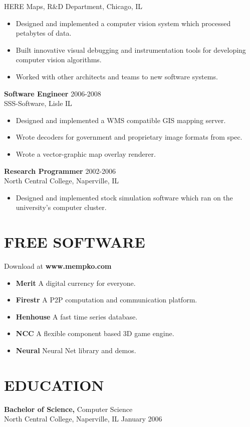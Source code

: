 \documentclass[line,margin]{res}
\begin{document}
\begin{resume}
                HERE Maps, 
                R\&D Department, Chicago, IL
                 \begin{itemize}  \itemsep -1pt %
                    \item Designed and implemented a computer vision 
                        system which processed petabytes of data.
                    \item Built innovative visual debugging and instrumentation tools for developing computer vision algorithms.
                    \item Worked with other architects and teams to new software systems.
                \end{itemize}
                {\bf Software Engineer} \hfill  2006-2008 \\
                SSS-Software, Lisle IL
                 \begin{itemize}  \itemsep -1pt 
                    \item Designed and implemented a WMS compatible GIS mapping server.
                    \item Wrote decoders for government and proprietary image formats from spec.  
                    \item Wrote a vector-graphic map overlay renderer.
                 \end{itemize} 
                {\bf Research Programmer} \hfill 2002-2006 \\
                North Central College, Naperville, IL
                \begin{itemize} \itemsep -1pt 
                    \item Designed and implemented stock simulation software
                        which ran on the university's computer cluster. 
                \end{itemize} 
\section{FREE SOFTWARE} Download at {\bf www.mempko.com} \\ 
                \begin{itemize} \itemsep -1pt 
                    \item {\bf Merit} A digital currency for everyone.
                    \item {\bf Firestr} A P2P computation and communication platform.
                    \item {\bf Henhouse} A fast time series database.
                    \item {\bf NCC} A flexible component based 3D game engine.
                    \item {\bf Neural} Neural Net library and demos.
                \end{itemize}

\section{EDUCATION} {\bf Bachelor of Science,} Computer Science \\
                North Central College, Naperville, IL 
                January 2006
\end{resume}
\end{document}
